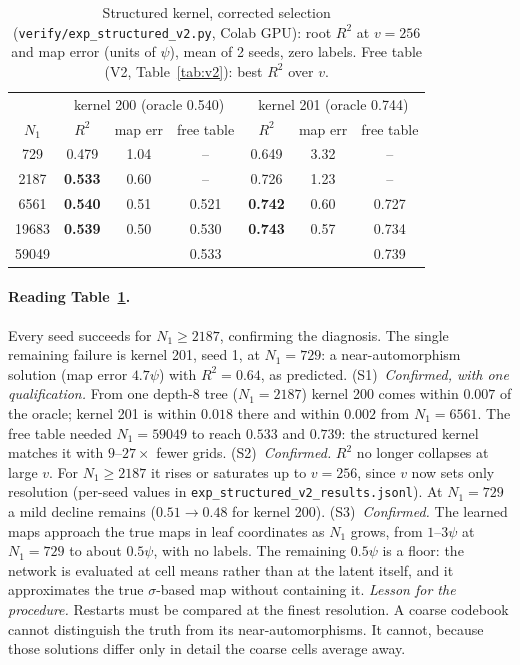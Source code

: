 \documentclass[11pt]{article}
\theoremstyle{definition}
\begin{document}
\begin{table}[h]\centering
\caption{Structured kernel, corrected selection (\texttt{verify/exp\_structured\_v2.py}, Colab GPU): root
$R^2$ at $v=256$ and map error (units of $\psi$), mean of 2 seeds, zero labels. Free table (V2,
Table~\ref{tab:v2}): best $R^2$ over $v$.}\label{tab:structured}
\small\begin{tabular}{c|cc|c||cc|c}\toprule
& \multicolumn{3}{c||}{kernel 200 (oracle 0.540)} & \multicolumn{3}{c}{kernel 201 (oracle 0.744)}\\
$N_1$ & $R^2$ & map err & free table & $R^2$ & map err & free table\\\midrule
729 & 0.479 & 1.04 & -- & 0.649 & 3.32 & --\\
2187 & \textbf{0.533} & 0.60 & -- & 0.726 & 1.23 & --\\
6561 & \textbf{0.540} & 0.51 & 0.521 & \textbf{0.742} & 0.60 & 0.727\\
19683 & \textbf{0.539} & 0.50 & 0.530 & \textbf{0.743} & 0.57 & 0.734\\
59049 & & & 0.533 & & & 0.739\\
\bottomrule\end{tabular}
\end{table}

\paragraph{Reading Table~\ref{tab:structured}.}
Every seed succeeds for $N_1\ge2187$, confirming the diagnosis. The single remaining failure is kernel 201,
seed 1, at $N_1=729$: a near-automorphism solution (map error $4.7\psi$) with $R^2=0.64$, as predicted.
(S1)~\emph{Confirmed, with one qualification.} From one depth-8 tree ($N_1=2187$) kernel 200 comes within
$0.007$ of the oracle; kernel 201 is within $0.018$ there and within $0.002$ from $N_1=6561$. The free table
needed $N_1=59049$ to reach $0.533$ and $0.739$: the structured kernel matches it with $9$--$27\times$ fewer
grids.
(S2)~\emph{Confirmed.} $R^2$ no longer collapses at large $v$. For $N_1\ge2187$ it rises or saturates up to
$v=256$, since $v$ now sets only resolution (per-seed values in \texttt{exp\_structured\_v2\_results.jsonl}).
At $N_1=729$ a mild decline remains ($0.51\to0.48$ for kernel 200).
(S3)~\emph{Confirmed.} The learned maps approach the true maps in leaf coordinates as $N_1$ grows, from
$1$--$3\psi$ at $N_1=729$ to about $0.5\psi$, with no labels. The remaining $0.5\psi$ is a floor: the network
is evaluated at cell means rather than at the latent itself, and it approximates the true
$\sigma$-based map without containing it.
\emph{Lesson for the procedure.} Restarts must be compared at the finest resolution. A coarse
codebook cannot distinguish the truth from its near-automorphisms. It cannot, because those solutions
differ only in detail the coarse cells average away.
\end{document}
